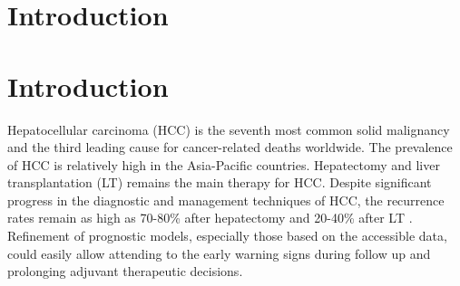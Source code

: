 \documentclass{article}
\begin{document}


\section{Introduction}
\lipsum[2]
\lipsum[3]


\section{Introduction}
\label{sec:headings}
Hepatocellular carcinoma (HCC) is the seventh most common solid malignancy and the third leading cause for cancer-related deaths worldwide\cite{bray2018global}. The prevalence of HCC is relatively high in the Asia-Pacific countries\cite{omata2017asia}. Hepatectomy and liver transplantation (LT) remains the main therapy for HCC. Despite significant progress in the diagnostic and management techniques of HCC, the recurrence rates remain as high as 70-80\% after hepatectomy and 20-40\% after LT \cite{kudo2017systemic}\cite{Llovet}\cite{llovet2019randomized}\cite{kulik2018therapies}. Refinement of prognostic models, especially those based on the accessible data, could easily allow attending to the early warning signs during follow up and prolonging adjuvant therapeutic decisions\cite{fujiwara2018risk}.
\end{document}
